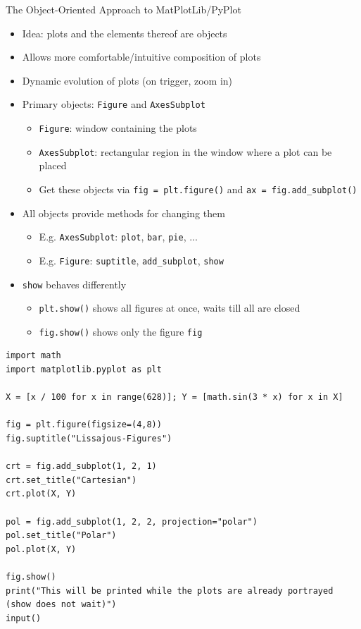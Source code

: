 
\begin{frame}[fragile]{The Object-Oriented Approach to MatPlotLib/PyPlot}
%
\begin{itemize}
\item Idea: plots and the elements thereof are objects
\item Allows more comfortable/intuitive composition of plots
\item Dynamic evolution of plots (\eg on trigger, zoom in)
\item Primary objects: \texttt{Figure} and \texttt{AxesSubplot}
	\begin{itemize}
	\item \texttt{Figure}: window containing the plots
	\item \texttt{AxesSubplot}: rectangular region in the window where a plot can be placed
	\item Get these objects via \texttt{fig = plt.figure()} and \texttt{ax = fig.add\_subplot()}
	\end{itemize}
\item All objects provide methods for changing them
	\begin{itemize}
	\item E.\;g. \texttt{AxesSubplot}: \texttt{plot}, \texttt{bar}, \texttt{pie}, ...
	\item E.\;g. \texttt{Figure}: \texttt{suptitle}, \texttt{add\_subplot}, \texttt{show}
	\end{itemize}
\item \texttt{show} behaves differently
	\begin{itemize}
	\item \texttt{plt.show()} shows all figures at once, waits till all are closed
	\item \texttt{fig.show()} shows only the figure \texttt{fig}
	\end{itemize}
\end{itemize}
%
\end{frame}


\begin{frame}[fragile]
%
\begin{codebox}
\begin{verbatim}
import math
import matplotlib.pyplot as plt

X = [x / 100 for x in range(628)]; Y = [math.sin(3 * x) for x in X]

fig = plt.figure(figsize=(4,8))
fig.suptitle("Lissajous-Figures")

crt = fig.add_subplot(1, 2, 1)
crt.set_title("Cartesian")
crt.plot(X, Y)

pol = fig.add_subplot(1, 2, 2, projection="polar")
pol.set_title("Polar")
pol.plot(X, Y)

fig.show()
print("This will be printed while the plots are already portrayed (show does not wait)")
input()
\end{verbatim}
\end{codebox}
%
\end{frame}

